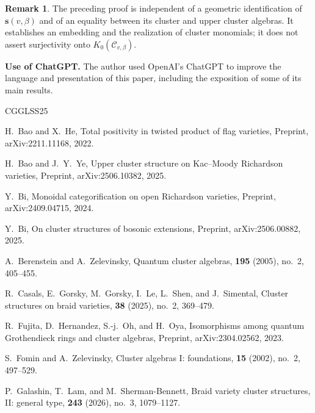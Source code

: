 \documentclass[12pt, reqno]{amsart}
\theoremstyle{plain}
\theoremstyle{definition}
\newtheorem{remark}[theorem]{Remark}
\numberwithin{equation}{section}
\begin{document}
\begin{remark}
The preceding proof is independent of a geometric identification of
\(\mathbf s(v,\beta)\) and of an equality between its cluster and
upper cluster algebras. It establishes an embedding and the
realization of cluster monomials; it does not assert surjectivity
onto \(K_0(\mathscr C_{v,\beta})\).
\end{remark}

\noindent
\textbf{Use of ChatGPT.}
The author used OpenAI's ChatGPT to improve the language and
presentation of this paper, including the exposition of some of its
main results.

\begin{thebibliography}{CGGLSS25}

H.~Bao and X.~He,
\newblock Total positivity in twisted product of flag varieties,
\newblock Preprint, arXiv:2211.11168, 2022.

H.~Bao and J.~Y.~Ye,
\newblock Upper cluster structure on Kac--Moody Richardson varieties,
\newblock Preprint, arXiv:2506.10382, 2025.

Y.~Bi,
\newblock Monoidal categorification on open Richardson varieties,
\newblock Preprint, arXiv:2409.04715, 2024.

Y.~Bi,
\newblock On cluster structures of bosonic extensions,
\newblock Preprint, arXiv:2506.00882, 2025.

A.~Berenstein and A.~Zelevinsky,
\newblock Quantum cluster algebras,
 \textbf{195} (2005), no.~2, 405--455.

R.~Casals, E.~Gorsky, M.~Gorsky, I.~Le, L.~Shen, and J.~Simental,
\newblock Cluster structures on braid varieties,
 \textbf{38} (2025), no.~2, 369--479.

R.~Fujita, D.~Hernandez, S.-j.~Oh, and H.~Oya,
\newblock Isomorphisms among quantum Grothendieck rings and cluster algebras,
\newblock Preprint, arXiv:2304.02562, 2023.

S.~Fomin and A.~Zelevinsky,
\newblock Cluster algebras I: foundations,
 \textbf{15} (2002), no.~2, 497--529.

P.~Galashin, T.~Lam, and M.~Sherman-Bennett,
\newblock Braid variety cluster structures, II: general type,
 \textbf{243} (2026), no.~3, 1079--1127.


\end{thebibliography}
\end{document}
